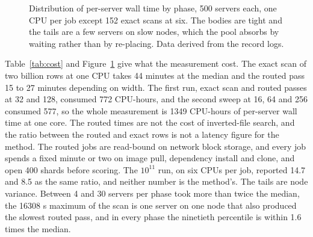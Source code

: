 \documentclass[sigconf, nonacm]{acmart}
\begin{document}
\begin{figure}[t]
\centering
{}
\caption{Distribution of per-server wall time by phase, 500 servers each, one CPU per job except
152 exact scans at six. The
bodies are tight and the tails are a few servers on slow nodes, which the pool absorbs by
waiting rather than by re-placing. Data derived from the record logs.}
\label{fig:wall}
\end{figure}

Table~\ref{tab:cost} and Figure~\ref{fig:wall} give what the measurement cost. The exact scan
of two billion rows at one CPU takes 44 minutes at the median and the routed pass 15 to 27
minutes depending on width. The first run, exact scan and routed passes at 32 and 128, consumed
772 CPU-hours, and the second sweep at 16, 64 and 256 consumed 577, so the whole measurement is
1349 CPU-hours of per-server wall time at one core. The routed times are not the cost of inverted-file search, and the ratio between the routed and
exact rows is not a latency figure for the method. The routed jobs are read-bound on network block
storage, and every job spends a fixed minute or two on image pull, dependency install and clone, and open 400 shards
before scoring. The $10^{11}$ run, on six CPUs per job, reported 14.7 and 8.5 as the same ratio,
and neither number is the method's. The tails are node variance. Between 4 and 30 servers per
phase took more than twice the median, the 16308 s maximum of the scan is one server on one
node that also produced the slowest routed pass, and in every phase the ninetieth percentile is
within 1.6 times the median.
\end{document}

